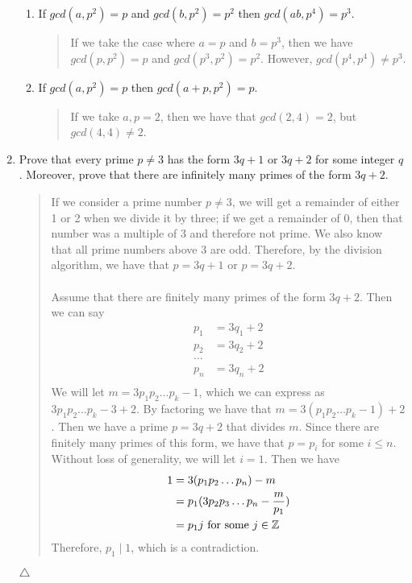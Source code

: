 \documentclass{hw}
\begin{document}
\begin{enumerate}
\begin{enumerate}
\item If $gcd(a, p^2) = p$ and $gcd(b, p^2) = p^2$ then $gcd(ab, p^4) = p^3$.
\begin{quote}
If we take the case where $a=p$ and $b=p^3$, then we have $gcd(p, p^2) = p$ and $gcd(p^3, p^2) = p^2$.
However, $gcd(p^4, p^4) \neq p^3$.
\end{quote}

\item If $gcd(a,p^2)=p$ then $gcd(a+p,p^2)=p$.
\begin{quote}
If we take $a,p=2$, then we have that $gcd(2,4)=2$, but $gcd(4,4)\neq 2$.
\end{quote}
\end{enumerate}



\item Prove that every prime $p\neq 3$ has the form $3q + 1$ or $3q + 2$ for some integer $q$. Moreover,
prove that there are infinitely many primes of the form $3q + 2$.
\begin{quote}
If we consider a prime number $p\neq 3$, we will get a remainder of either 1 or 2 when we divide it by
three; if we get a remainder of 0, then that number was a multiple of 3 and therefore not prime. We
also know that all prime numbers above 3 are odd. Therefore, by the division algorithm, we have that
$p=3q+1$ or $p=3q+2$.\\\\
Assume that there are finitely many primes of the form $3q + 2$. Then we can say
\begin{align*}
p_1 &= 3q_1 + 2\\
p_2 &= 3q_2 + 2\\
\dots& \\
p_n &= 3q_n + 2\\
\end{align*}
We will let $m = 3p_1p_2\dots p_k-1$, which we can express as $3p_1p_2\dots p_k-3+2$. By factoring
we have that $m=3(p_1p_2\dots p_k-1)+2$. Then we have a prime $p = 3q+2$ that divides $m$. Since there
are finitely many primes of this form, we have that $p=p_i$ for some $i \leq n$. Without loss of
generality, we will let $i=1$. Then we have
\begin{align*}
1 &= 3(p_1p_2\dots p_n)-m\\
&= p_1(3p_2p_3\dots p_n - {m\over p_1})\\
&= p_1j\text{ for some } j\in\mathbb{Z}
\end{align*}
Therefore, $p_1\mid1$, which is a contradiction.
\end{quote}
$\triangle$




\end{enumerate}
\end{document}
